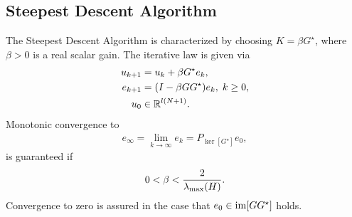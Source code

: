 \subsection{Steepest Descent Algorithm}
\begin{alg}
	\label{alg:SDA}
	The Steepest Descent Algorithm is characterized by choosing $K = \beta G^\star$, where $\beta>0$ is a real scalar gain. The iterative law is given via 
	\begin{align}
	\label{eq:errSDA}
	\begin{split}
	u_{k+1} &= u_k + \beta G^\star e_k,\\
	e_{k+1} &= (I- \beta G G^\star) e_{k}, \; k\geq 0,\\
	u_0 &\in {\mathbb{R}}^{l (N+1)}. 
	\end{split}
	\end{align}
	Monotonic convergence to 
	\begin{align}
	\label{eq:SDAErrLim} 
	e_\infty  = \lim_{k\to\infty} e_k = P_{\ker[G^\star]}e_0,
	\end{align} 
	is guaranteed if
	\begin{align*}
	0 <\beta < \frac{2}{\lambda_{\mathrm{max}}(H)}.
	\end{align*}
	Convergence to zero is assured in the case that $e_0 \in \operatorname{im} [G G^\star]$ holds.
\end{alg} 
